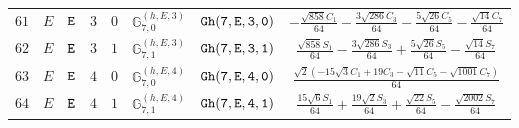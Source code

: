 \documentclass[fleqn,8pt]{jsarticle}
\begin{document}
\begin{table}[ht!]
\begin{center}
\begin{tabular}{cccccccc}
$ 61 $ & $ E $ & $ {\tt E} $ & $ 3 $ & $ 0 $ & $ \mathbb{G}_{7,0}^{(h,E,3)} $ & $ {\tt Gh(7,E,3,0)} $ & $ - \frac{\sqrt{858} C_{1}}{64} - \frac{3 \sqrt{286} C_{3}}{64} - \frac{5 \sqrt{26} C_{5}}{64} - \frac{\sqrt{14} C_{7}}{64} $ \\
$ 62 $ & $ E $ & $ {\tt E} $ & $ 3 $ & $ 1 $ & $ \mathbb{G}_{7,1}^{(h,E,3)} $ & $ {\tt Gh(7,E,3,1)} $ & $ \frac{\sqrt{858} S_{1}}{64} - \frac{3 \sqrt{286} S_{3}}{64} + \frac{5 \sqrt{26} S_{5}}{64} - \frac{\sqrt{14} S_{7}}{64} $ \\
$ 63 $ & $ E $ & $ {\tt E} $ & $ 4 $ & $ 0 $ & $ \mathbb{G}_{7,0}^{(h,E,4)} $ & $ {\tt Gh(7,E,4,0)} $ & $ \frac{\sqrt{2} \left(- 15 \sqrt{3} C_{1} + 19 C_{3} - \sqrt{11} C_{5} - \sqrt{1001} C_{7}\right)}{64} $ \\
$ 64 $ & $ E $ & $ {\tt E} $ & $ 4 $ & $ 1 $ & $ \mathbb{G}_{7,1}^{(h,E,4)} $ & $ {\tt Gh(7,E,4,1)} $ & $ \frac{15 \sqrt{6} S_{1}}{64} + \frac{19 \sqrt{2} S_{3}}{64} + \frac{\sqrt{22} S_{5}}{64} - \frac{\sqrt{2002} S_{7}}{64} $ \\
 \hline \hline
\end{tabular}
\end{center}
\end{table}
\end{document}
